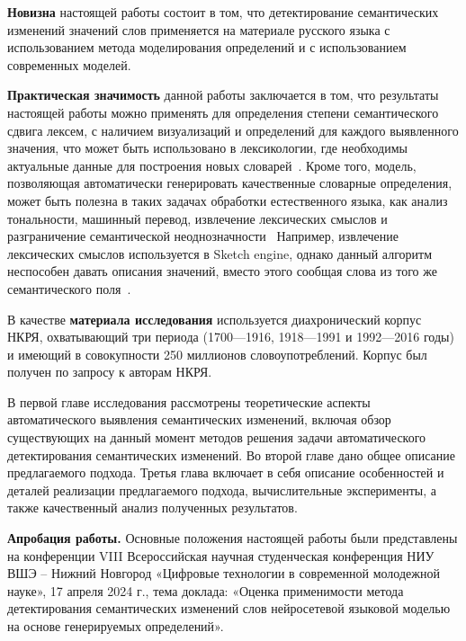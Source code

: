 \documentclass[LI,VKR]{HSEUniversity}
\begin{document}
\textbf{Новизна} настоящей работы состоит в том, что детектирование семантических изменений
значений слов применяется на материале русского языка с использованием метода
моделирования определений и с использованием современных моделей.

\textbf{Практическая значимость} данной работы заключается в том, что результаты настоящей работы
можно применять для определения степени семантического сдвига лексем, с наличием визуализаций и
определений для каждого выявленного значения, что может быть использовано в лексикологии,
где необходимы актуальные данные для построения новых словарей~\cite{DefinitionGenerationMainArticle}.
Кроме того, модель, позволяющая автоматически генерировать качественные словарные определения,
может быть полезна в таких задачах обработки естественного языка, как анализ тональности,
машинный перевод, извлечение лексических смыслов и разграничение семантической неоднозначности~\cite{
    DefinitionModelingReviewAndDatasetAnalysis}
Например, извлечение лексических смыслов используется в Sketch engine,
однако данный алгоритм неспособен давать описания значений,
вместо этого сообщая слова из того же семантического поля~.

В качестве \textbf{материала исследования} используется диахронический корпус НКРЯ, охватывающий
три периода (1700—1916, 1918—1991 и 1992—2016 годы) и имеющий в совокупности 250 миллионов
словоупотреблений.
Корпус был получен по запросу к авторам НКРЯ.

В первой главе исследования рассмотрены теоретические аспекты автоматического выявления
семантических изменений, включая обзор существующих на данный момент методов
решения задачи автоматического детектирования семантических изменений.
Во второй главе дано общее описание предлагаемого подхода.
Третья глава включает в себя описание особенностей и деталей
реализации предлагаемого подхода,
вычислительные эксперименты, а также качественный анализ полученных результатов.

\textbf{Апробация работы.}
Основные положения настоящей работы были представлены на конференции
VIII Всероссийская научная студенческая конференция НИУ ВШЭ – Нижний Новгород
«Цифровые технологии в современной молодежной науке», 17 апреля 2024 г.,
тема доклада: «Оценка применимости метода детектирования семантических изменений слов нейросетевой
языковой моделью на основе генерируемых определений».
\end{document}
